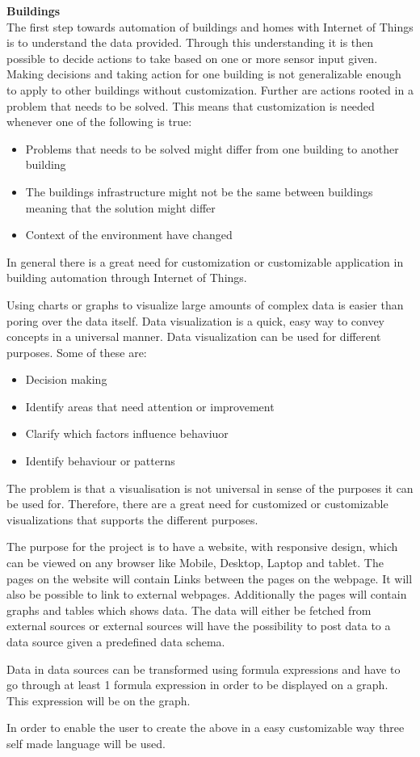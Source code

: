 \textbf{Buildings}\\
The first step towards automation of buildings and homes with Internet of Things is to understand the data provided. 
Through this understanding it is then possible to decide actions to take based on one or more sensor input given. 
Making decisions and taking action for one building is not generalizable enough to apply to other buildings without customization. 
Further are actions rooted in a problem that needs to be solved. 
This means that customization is needed whenever one of the following is true:
\begin{itemize}
\item Problems that needs to be solved might differ from one building to another building
\item The buildings infrastructure might not be the same between buildings meaning that the solution might differ
\item Context of the environment have changed
\end{itemize}

In general there is a great need for customization or customizable application in building automation through Internet of Things.

Using charts or graphs to visualize large amounts of complex data is easier than poring over the data itself. 
Data visualization is a quick, easy way to convey concepts in a universal manner. Data visualization can be used for different purposes. 
Some of these are:
\begin{itemize}
\item Decision making
\item Identify areas that need attention or improvement
\item Clarify which factors influence behaviuor
\item Identify behaviour or patterns
\end{itemize}

The problem is that a visualisation is not universal in sense of the purposes it can be used for. 
Therefore, there are a great need for customized or customizable visualizations that supports the different purposes. 

The purpose for the project is to have a website, with responsive design, which can be viewed on any browser like Mobile, Desktop, Laptop and tablet. 
The pages on the website will contain Links between the pages on the webpage. 
It will also be possible to link to external webpages. 
Additionally the pages will contain graphs and tables which shows data. 
The data will either be fetched from external sources or external sources will have the possibility to post data to a data source given a predefined data schema. 

Data in data sources can be transformed using formula expressions and have to go through at least 1 formula expression in order to be displayed on a graph. 
This expression will be on the graph. 

In order to enable the user to create the above in a easy customizable way three self made language will be used.


